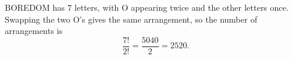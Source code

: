 BOREDOM has $7$ letters, with O appearing twice and the other letters once. Swapping the two O's gives the same arrangement, so the number of arrangements is
\[\dfrac{7!}{2!}=\dfrac{5040}{2}=\boxed{2520}.\]
